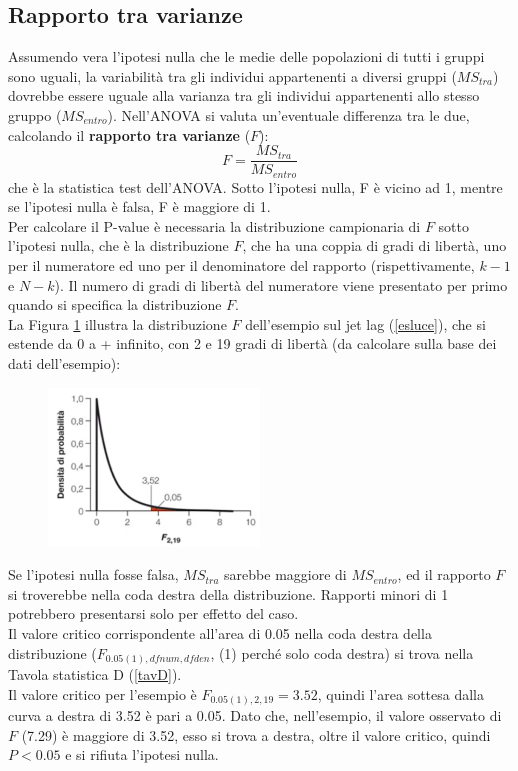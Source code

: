 \documentclass[10pt, draft]{book}
\begin{document}
\subsection{Rapporto tra varianze}

Assumendo vera l'ipotesi nulla che le medie delle popolazioni di tutti i gruppi sono uguali, la variabilità tra gli individui appartenenti a diversi gruppi ($MS_{tra}$) dovrebbe essere uguale alla varianza tra gli individui appartenenti allo stesso gruppo ($MS_{entro}$). Nell'ANOVA si valuta un'eventuale differenza tra le due, calcolando il \textbf{rapporto tra varianze} ($F$):
\begin{equation}
    F = \frac{MS_{tra}}{MS_{entro}}
\end{equation}
che è la statistica test dell'ANOVA. Sotto l'ipotesi nulla, F è vicino ad 1, mentre se l'ipotesi nulla è falsa, F è maggiore di 1.\\
Per calcolare il P-value è necessaria la distribuzione campionaria di $F$ sotto l'ipotesi nulla, che è la distribuzione $F$, che ha una coppia di gradi di libertà, uno per il numeratore ed uno per il denominatore del rapporto (rispettivamente, $k-1$ e $N-k$). Il numero di gradi di libertà del numeratore viene presentato per primo quando si specifica la distribuzione $F$.\\
La Figura \ref{fig15.1-3} illustra la distribuzione $F$ dell'esempio sul jet lag (\ref{esluce}), che si estende da 0 a + infinito, con 2 e 19 gradi di libertà (da calcolare sulla base dei dati dell'esempio):\\
\begin{figure}[H]
    \centering
    \includegraphics[width=0.5\textwidth]{fig15.1-3}
    \caption{\small{}}
    \label{fig15.1-3}
\end{figure}

Se l'ipotesi nulla fosse falsa, $MS_{tra}$ sarebbe maggiore di $MS_{entro}$, ed il rapporto $F$ si troverebbe nella coda destra della distribuzione. Rapporti minori di 1 potrebbero presentarsi solo per effetto del caso.\\
Il valore critico corrispondente all'area di 0.05 nella coda destra della distribuzione ($F_{0.05(1),dfnum,dfden}$, (1) perché solo coda destra) si trova nella Tavola statistica D (\ref{tavD}).\\
Il valore critico per l'esempio è $F_{0.05(1),2,19} = 3.52$, quindi l'area sottesa dalla curva a destra di 3.52 è pari a 0.05. Dato che, nell'esempio, il valore osservato di $F$ (7.29) è maggiore di 3.52, esso si trova a destra, oltre il valore critico, quindi $P<0.05$ e si rifiuta l'ipotesi nulla.
\end{document}
